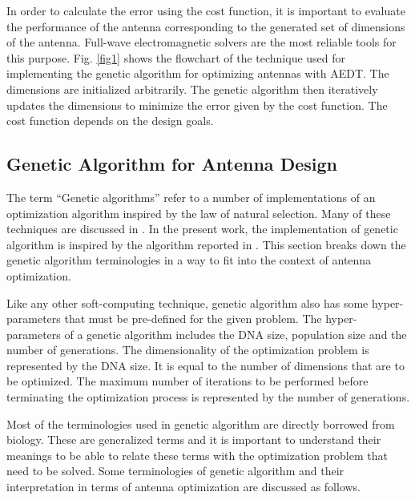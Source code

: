 In order to calculate the error using the cost function, it is important to evaluate the performance of the antenna corresponding to the generated set of dimensions of the antenna. Full-wave electromagnetic solvers are the most reliable tools for this purpose. Fig. \ref{fig1} shows the flowchart of the technique used for implementing the genetic algorithm for optimizing antennas with AEDT. The dimensions are initialized arbitrarily. The genetic algorithm then iteratively updates the dimensions to minimize the error given by the cost function. The cost function depends on the design goals.

\subsection{Genetic Algorithm for Antenna Design}
The term ``Genetic algorithms'' refer to a number of implementations of an optimization algorithm inspired by the law of natural selection. Many of these techniques are discussed in \cite{gaBook}. In the present work, the implementation of genetic algorithm is inspired by the algorithm reported in \cite{gaImpl}. This section breaks down the genetic algorithm terminologies in a way to fit into the context of antenna optimization.

Like any other soft-computing technique, genetic algorithm also has some hyper-parameters that must be pre-defined for the given problem. The hyper-parameters of a genetic algorithm includes the DNA size, population size and the number of generations. The dimensionality of the optimization problem is represented by the DNA size. It is equal to the number of dimensions that are to be optimized. The maximum number of iterations to be performed before terminating the optimization process is represented by the number of generations.

Most of the terminologies used in genetic algorithm are directly borrowed from biology. These are generalized terms and it is important to understand their meanings to be able to relate these terms with the optimization problem that need to be solved. Some terminologies of genetic algorithm and their interpretation in terms of antenna optimization are discussed as follows.

